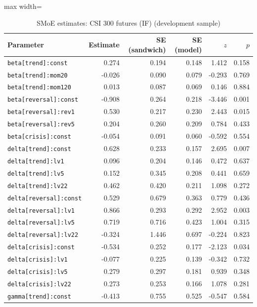 \begin{table}[!htbp]\centering\scriptsize
\caption{SMoE estimates: CSI 300 futures (IF) (development sample)}\label{tab:params_if_main}
\begin{adjustbox}{max width=\textwidth}
\begin{tabular}{lrrrrr}
\toprule
Parameter & Estimate & SE (sandwich) & SE (model) & $z$ & $p$\\
\midrule
\texttt{beta[trend]:const} & 0.274 & 0.194 & 0.148 & 1.412 & 0.158\\
\texttt{beta[trend]:mom20} & -0.026 & 0.090 & 0.079 & -0.293 & 0.769\\
\texttt{beta[trend]:mom120} & 0.013 & 0.087 & 0.069 & 0.146 & 0.884\\
\texttt{beta[reversal]:const} & -0.908 & 0.264 & 0.218 & -3.446 & 0.001\\
\texttt{beta[reversal]:rev1} & 0.530 & 0.217 & 0.230 & 2.443 & 0.015\\
\texttt{beta[reversal]:rev5} & 0.204 & 0.260 & 0.209 & 0.784 & 0.433\\
\texttt{beta[crisis]:const} & -0.054 & 0.091 & 0.060 & -0.592 & 0.554\\
\texttt{delta[trend]:const} & 0.628 & 0.233 & 0.157 & 2.695 & 0.007\\
\texttt{delta[trend]:lv1} & 0.096 & 0.204 & 0.146 & 0.472 & 0.637\\
\texttt{delta[trend]:lv5} & 0.152 & 0.345 & 0.208 & 0.441 & 0.659\\
\texttt{delta[trend]:lv22} & 0.462 & 0.420 & 0.211 & 1.098 & 0.272\\
\texttt{delta[reversal]:const} & 0.529 & 0.679 & 0.363 & 0.779 & 0.436\\
\texttt{delta[reversal]:lv1} & 0.866 & 0.293 & 0.292 & 2.952 & 0.003\\
\texttt{delta[reversal]:lv5} & 0.719 & 0.716 & 0.423 & 1.004 & 0.315\\
\texttt{delta[reversal]:lv22} & -0.324 & 1.446 & 0.697 & -0.224 & 0.823\\
\texttt{delta[crisis]:const} & -0.534 & 0.252 & 0.177 & -2.123 & 0.034\\
\texttt{delta[crisis]:lv1} & -0.077 & 0.225 & 0.139 & -0.342 & 0.732\\
\texttt{delta[crisis]:lv5} & 0.279 & 0.297 & 0.181 & 0.939 & 0.348\\
\texttt{delta[crisis]:lv22} & 0.273 & 0.253 & 0.166 & 1.078 & 0.281\\
\texttt{gamma[trend]:const} & -0.413 & 0.755 & 0.525 & -0.547 & 0.584\\

\end{tabular}
\end{adjustbox}
\end{table}
